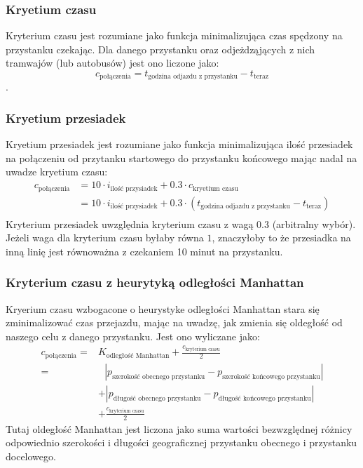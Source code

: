 \documentclass[12pt,a4paper]{article}
\begin{document}
    \subsubsection*{Kryetium czasu}
    Kryterium czasu jest rozumiane jako funkcja minimalizująca czas spędzony na przystanku czekając. Dla danego przystanku oraz odjeżdząjących z nich tramwajów (lub autobusów) jest ono liczone jako:$$c_{\text{połączenia}} = t_{\text{godzina odjazdu z przystanku}} - t_{\text{teraz}}$$.
    \subsubsection*{Kryetium przesiadek}
    Kryetium przesiadek jest rozumiane jako funkcja minimalizująca ilość przesiadek na połączeniu od przytanku startowego do przystanku końcowego mając nadal na uwadze kryetium czasu:
    \begin{align*}
        c_{\text{połączenia}}  &= 10 \cdot i_{\text{ilość przysiadek}} + 0.3 \cdot  c_{\text{kryetium czasu}}\\
        &= 10 \cdot i_{\text{ilość przysiadek}} + 0.3 \cdot  (t_{\text{godzina odjazdu z przystanku}} - t_{\text{teraz}})\\
    \end{align*}
    Kryterium przesiadek uwzględnia kryterium czasu z wagą $0.3$ (arbitralny wybór). Jeżeli waga dla kryterium czasu byłaby równa $1$, znaczyłoby to że przesiadka na inną linię jest równoważna z czekaniem 10 minut na przystanku.
    \subsubsection*{Kryterium czasu z heurytyką odległości Manhattan}
    Kryerium czasu wzbogacone o heurystyke odległości Manhattan stara się zminimalizować czas przejazdu, mając na uwadzę, jak zmienia się oldegłość od naszego celu z danego przystanku. Jest ono wyliczane jako:
    \begin{align*}
        c_{\text{połączenia}} =& K_{\text{odległość Manhattan}} + \frac{c_{\text{kryterium czasu}}}{2}\\
        =& \text{ } |p_{\text{szerokość obecnego przystanku}} - p_{\text{szerokość końcowego przystanku}} |\\
        & + |p_{\text{długość obecnego przystanku}} - p_{\text{długość końcowego przystanku}} | \\
        & + \frac{c_{\text{kryterium czasu}}}{2}
    \end{align*}
    Tutaj oldegłość Manhattan jest liczona jako suma wartości bezwzględnej różnicy odpowiednio szerokości i długości geograficznej przystanku obecnego i przystanku docelowego.
\end{document}
